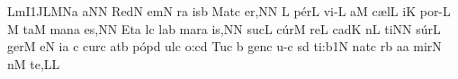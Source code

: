 

\smallskip

\Internote
\nosolesmescustos
\initiumgregorianum
%
\sgn {}Lm\episem I1\punctum J\nonspatium\pes LM\nonspatium\pes Na\egn
\sgn {}a{}\punctum N\augmentum N\egn
\spatium
\asteriscus
\spatium
\sgn Red\punctum N\egn
\sgn {}em\punctum N\egn
{}r\punctum a\egn
\sgn {}is\punctum b\egn
\spatium
\sgn M{a}t\punctum c\egn
\sgn {}e{r,}\punctum N\augmentum N\egn
\spatium
\divisiominor
\spatium
\punctum L\egn
\spatium
\sgn p{\'e}r\punctum L\egn
\sgn vi{-}\punctum L\egn
\sgn {}a{}\punctum M\egn
\spatium
\sgn c{\ae}l\punctum L\egn
\sgn {}i{}\punctum K\egn
\spatium
\sgn p{o}{r-}\punctum L\egn
\custos M
\lineaproxima{}\Internote
\sgn ta{}\punctum M\egn
\spatium
\sgn m{a}n\engl{}\punctum a\egn
\sgn {}e{s,}\punctum N\augmentum N\egn
\spatium
\divisiominor
\spatium
\sgn {}Et\punctum a\egn
\spatium
\spatium
{}l\punctum c\egn
\sgn la{}\punctum b\egn
\spatium
\sgn m{a}r\punctum a\egn
\sgn {}i{s,}\punctum N\augmentum N\egn
\spatium
\divisiominor
\spatium
\sgn suc\punctum L\egn
\sgn c{\'u}r\punctum M\egn
\sgn re{}\punctum L\egn
\spatium
\sgn cad\punctum K\egn
{}n\punctum L\egn
\sgn ti{}\punctum N\augmentum N\egn
\spatium
\divisiominor
\spatium
\sgn s{\'u}r\punctum L\egn
\sgn ger\punctum M\egn
\sgn {}e{}\punctum N\egn
\spatium
{}i{}\punctum a\egn
\spatium
\custos c
\lineaproxima
\sgn c{u}r\punctum c\egn
\sgn {}at\punctum b\egn
\spatium
\sgn p{\'o}p\punctum d\egn
\sgn {}ul\punctum c\egn
\sgn {}o:\punctum c\augmentum d\egn
\spatium
\divisiomaior
\spatium
\sgn Tu{}\punctum c\egn
\spatium
{}\punctum b\egn
\spatium
\sgn gen\punctum c\egn
\sgn {}u{-}\punctum c\egn
\sgn {}{\'\i}s\punctum d\egn
\sgn ti:\episem b1\punctum N\egn
\spatium
\divisiominor
\spatium
\sgn nat\punctum c\egn
{}r\punctum b\egn
\sgn {}a{}\punctum a\egn
\spatium
\sgn mir\punctum N\egn
{}n\punctum M\egn
\sgn te,\punctum L\augmentum L\egn
\spatium
\divisiominor
\spatium
